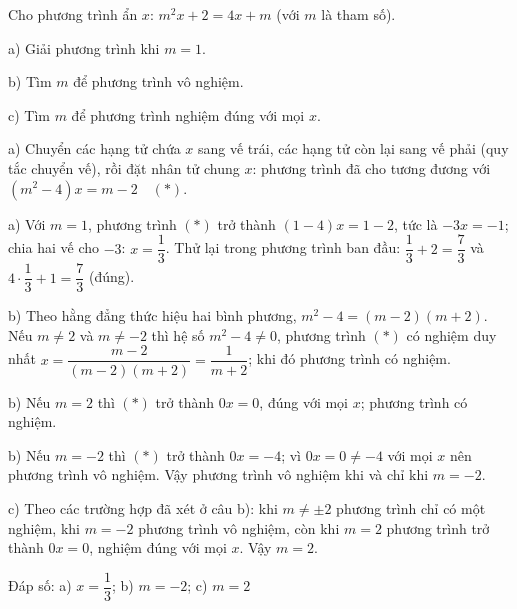 \begin{problem}[8DS-PT1-019]
Cho phương trình ẩn $x$: $m^2x + 2 = 4x + m$ (với $m$ là tham số).

a) Giải phương trình khi $m = 1$.

b) Tìm $m$ để phương trình vô nghiệm.

c) Tìm $m$ để phương trình nghiệm đúng với mọi $x$.

\begin{solution}
a) Chuyển các hạng tử chứa $x$ sang vế trái, các hạng tử còn lại sang vế phải (quy tắc chuyển vế), rồi đặt nhân tử chung $x$: phương trình đã cho tương đương với $(m^2 - 4)x = m - 2 \quad (*)$.

a) Với $m = 1$, phương trình $(*)$ trở thành $(1 - 4)x = 1 - 2$, tức là $-3x = -1$; chia hai vế cho $-3$: $x = \dfrac{1}{3}$. Thử lại trong phương trình ban đầu: $\dfrac{1}{3} + 2 = \dfrac{7}{3}$ và $4 \cdot \dfrac{1}{3} + 1 = \dfrac{7}{3}$ (đúng).

b) Theo hằng đẳng thức hiệu hai bình phương, $m^2 - 4 = (m - 2)(m + 2)$. Nếu $m \neq 2$ và $m \neq -2$ thì hệ số $m^2 - 4 \neq 0$, phương trình $(*)$ có nghiệm duy nhất $x = \dfrac{m - 2}{(m - 2)(m + 2)} = \dfrac{1}{m + 2}$; khi đó phương trình có nghiệm.

b) Nếu $m = 2$ thì $(*)$ trở thành $0x = 0$, đúng với mọi $x$; phương trình có nghiệm.

b) Nếu $m = -2$ thì $(*)$ trở thành $0x = -4$; vì $0x = 0 \neq -4$ với mọi $x$ nên phương trình vô nghiệm. Vậy phương trình vô nghiệm khi và chỉ khi $m = -2$.

c) Theo các trường hợp đã xét ở câu b): khi $m \neq \pm 2$ phương trình chỉ có một nghiệm, khi $m = -2$ phương trình vô nghiệm, còn khi $m = 2$ phương trình trở thành $0x = 0$, nghiệm đúng với mọi $x$. Vậy $m = 2$.

Đáp số: a) $\boxed{x = \dfrac{1}{3}}$; b) $\boxed{m = -2}$; c) $\boxed{m = 2}$
\end{solution}
\end{problem}

